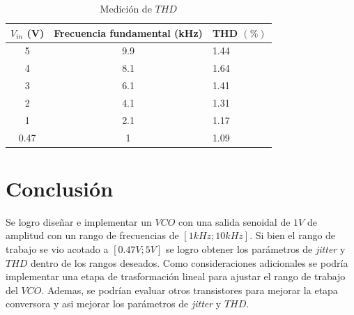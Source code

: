 \begin{table}[!h]
    \centering
    \begin{tabular}{@{}ccl@{}}
    \toprule
    $V_{in}$ (V) & Frecuencia fundamental (kHz) & THD $(\%)$ \\ \midrule
    5            & 9.9                          & 1.44       \\
    4            & 8.1                          & 1.64       \\
    3            & 6.1                          & 1.41       \\
    2            & 4.1                          & 1.31       \\
    1            & 2.1                          & 1.17       \\
    0.47         & 1                            & 1.09       \\ \bottomrule
    \end{tabular}
    \caption{Medición de $THD$}
    \label{tab:medicion_thd}
    \end{table}

\section{Conclusión}
Se logro diseñar e implementar un $VCO$ con una salida senoidal de $1V$ de amplitud con un rango de frecuencias de $[1kHz; 10kHz]$. Si bien el rango de trabajo se vio acotado a $[0.47V;5V]$ se logro obtener los parámetros de \textit{jitter} y $THD$ dentro de los rangos deseados. Como consideraciones adicionales se podría implementar una etapa de trasformación lineal para ajustar el rango de trabajo del $VCO$. Ademas, se podrían evaluar otros transistores para mejorar la etapa conversora y asi mejorar los parámetros de \textit{jitter} y $THD$. 





